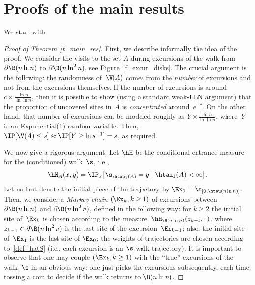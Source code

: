\section{Proofs of the main results}\label{s_proofs}

We start with

\begin{proof}[Proof of Theorem~\ref{t_main_res}]
First, we describe informally the idea of the proof. We consider the visits to the set $A$ during excursions of the walk from $\partial\B(n\ln n)$ to $\partial\B(n\ln^2 n)$, see Figure~\ref{f_excur_disks}. The crucial argument is the following: the randomness of~$\V(A)$ comes from the \emph{number} of excursions and not from the excursions themselves. If the number of excursions is around $c\times\frac{\ln n}{\ln\ln n}$, then it is possible to show (using a standard weak-LLN argument) that the proportion of uncovered sites in~$A$ is \emph{concentrated} around~$e^{-c}$. On the other hand, that number of excursions can be modeled roughly as $Y \times\frac{\ln n}{\ln\ln n}$, where~$Y$ is an Exponential($1$) random variable. Then, $\IP[\V(A)\leq s]\approx \IP[Y\geq \ln s^{-1}]=s$, as required.

We now give a rigorous argument. Let $\hH$ be the conditional entrance measure for the (conditioned) walk~$\s$, i.e.,
\begin{equation}\label{df_hatH}
\hH_A(x,y) = \IP_x\big[\s_{\htau_1(A)}=y \mid \htau_1(A)<\infty\big].
\end{equation}
Let us first denote the initial piece of the trajectory by $\Ex_0=\s_{[0,\htau(n\ln n)]}$. Then, we consider a \emph{Markov chain} $(\Ex_k,k\geq 1)$ of excursions between $\partial\B(n\ln n)$ and $\partial\B(n\ln^2 n)$, defined in the following way: for $k\geq 2$ the initial site of~$\Ex_k$ is chosen according to the measure~$\hH_{\B(n\ln n)}(z_{k-1},\cdot\,)$, where $z_{k-1}\in\partial\B(n\ln^2 n)$ is the last site of the excursion~$\Ex_{k-1}$; also, the initial site of~$\Ex_1$ is the last site of $\Ex_0$; the weights of trajectories are chosen according to~\eqref{def_hatS} (i.e., each excursion is an $\s$-walk trajectory). It is important to observe that one may couple $(\Ex_k,k\geq 1)$ with the ``true'' excursions of the walk~$\s$ in an obvious way: one just picks the excursions subsequently, each time tossing a coin to decide if the walk returns to $\B(n\ln n)$.


\end{proof}
